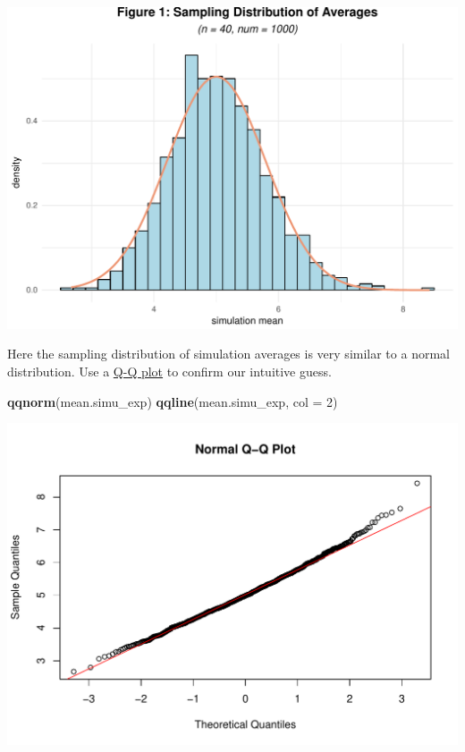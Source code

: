 \documentclass[]{article}
\newenvironment{Shaded}{\begin{snugshade}}{\end{snugshade}}
\newcommand{\KeywordTok}[1]{\textcolor[rgb]{0.13,0.29,0.53}{\textbf{#1}}}
\newcommand{\DataTypeTok}[1]{\textcolor[rgb]{0.13,0.29,0.53}{#1}}
\newcommand{\DecValTok}[1]{\textcolor[rgb]{0.00,0.00,0.81}{#1}}
\newcommand{\NormalTok}[1]{#1}
\begin{document}
\includegraphics{Final_Project_files/figure-latex/unnamed-chunk-4-1.pdf}

Here the sampling distribution of simulation averages is very similar to
a normal distribution. Use a
\href{https://en.wikipedia.org/wiki/Q\%E2\%80\%93Q_plot}{Q-Q plot} to
confirm our intuitive guess.

\begin{Shaded}
\begin{Highlighting}[]
\KeywordTok{qqnorm}\NormalTok{(mean.simu_exp)}
\KeywordTok{qqline}\NormalTok{(mean.simu_exp, }\DataTypeTok{col =} \DecValTok{2}\NormalTok{)}
\end{Highlighting}
\end{Shaded}

\includegraphics{Final_Project_files/figure-latex/unnamed-chunk-5-1.pdf}
\end{document}
